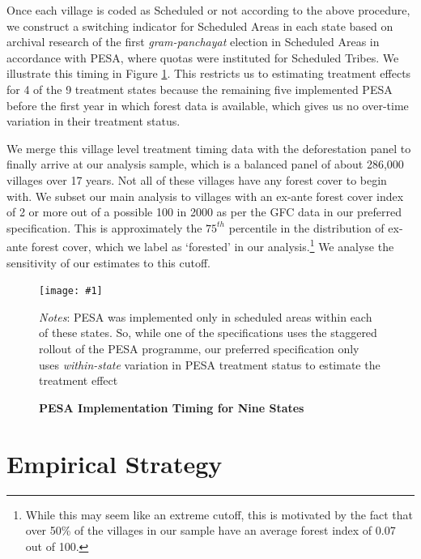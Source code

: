 \documentclass[12pt,reqno]{article}
\newcommand{\figinc}[1]{\texttt{[image: \#1]}}
\begin{document}
Once each village is coded as Scheduled or not according to the above procedure, we construct a switching indicator for Scheduled Areas in each state based on archival research of the first \emph{gram-panchayat} election in Scheduled Areas in accordance with PESA, where quotas were instituted for Scheduled Tribes. We illustrate this timing in Figure \ref{fig:timing}. This restricts us to estimating treatment effects for 4 of the 9 treatment states because the remaining five implemented PESA before the first year in which forest data is available, which gives us no over-time variation in their treatment status.  

We merge this village level treatment timing data with the deforestation panel to finally arrive at our analysis sample, which is a balanced panel of about 286,000 villages over 17 years. Not all of these villages have any forest cover to begin with. We subset our main analysis to villages with an ex-ante forest cover index of 2 or more out of a possible 100 in 2000 as per the GFC data in our preferred specification. This is approximately the $75^{th}$ percentile in the distribution of ex-ante forest cover, which we label as `forested' in our analysis.\footnote{While this may seem like an extreme cutoff, this is motivated by the fact that over 50\% of the villages in our sample have an average forest index of 0.07 out of 100.} We analyse the sensitivity of our estimates to this cutoff.

\begin{figure}[htbp!]
\begin{center}
\begin{minipage}{1 \linewidth}
\caption{\textbf{PESA Implementation Timing for Nine States} \label{fig:timing}}	
\centerline{\figinc{Output/PESA_adopt2.pdf}}
\smallskip
\normalsize
\emph{Notes}: PESA was implemented only in scheduled areas within each of these states. So, while one of the specifications uses the staggered rollout of the PESA programme, our preferred specification only uses \emph{within-state} variation in PESA treatment status to estimate the treatment effect 
\end{minipage}
\end{center}
\end{figure}

\section{Empirical Strategy} %
\label{sec:empirical_strategy}
\end{document}
